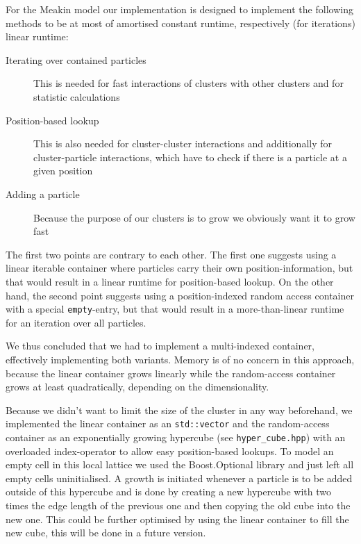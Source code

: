 \documentclass[twocolumn,10pt]{scrartcl}
\begin{document}
                For the Meakin model our implementation is designed to implement the following methods to be at most
                of amortised constant runtime, respectively (for iterations) linear runtime:
                \begin{description}
                    \item[Iterating over contained particles] This is needed for fast interactions of clusters with
                        other clusters and for statistic calculations
                    \item[Position-based lookup] This is also needed for cluster-cluster interactions and additionally
                        for cluster-particle interactions, which have to check if there is a particle at a given
                        position
                    \item[Adding a particle] Because the purpose of our clusters is to grow we obviously want it to grow
                        fast
                \end{description}
                The first two points are contrary to each other. The first one suggests using a linear iterable
                container where particles carry their own position-information, but that would result in a linear
                runtime for position-based lookup. On the other hand, the second point suggests using a position-indexed
                random access container with a special \lstinline'empty'-entry, but that would result in a
                more-than-linear runtime for an iteration over all particles.

                We thus concluded that we had to implement a multi-indexed container, effectively implementing both
                variants. Memory is of no concern in this approach, because the linear container grows linearly while
                the random-access container grows at least quadratically, depending on the dimensionality.

                Because we didn't want to limit the size of the cluster in any way beforehand, we implemented the linear
                container as an \lstinline'std::vector' and the random-access container as an exponentially growing
                hypercube (see \lstinline'hyper_cube.hpp') with an overloaded index-operator to allow easy
                position-based lookups. To model an empty cell in this local lattice we used the Boost.Optional
                library\cite{boost-optional} and just left all empty cells uninitialised. A growth is initiated whenever
                a particle is to be added outside of this hypercube and is done by creating a new hypercube with two
                times the edge length of the previous one and then copying the old cube into the new one. This could be
                further optimised by using the linear container to fill the new cube, this will be done in a future
                version.
\end{document}
